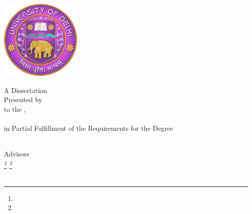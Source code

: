 \begin{titlepage}
\enlargethispage{3cm}
\centering

\includegraphics[width=4cm, height=4cm]{res/du_logo.png}

\vspace{25mm}
{\huge\textcolor{mygray}\getTitle{}}

\vspace{25mm}
A Dissertation \\
Presented by {\itshape\getAuthor{}} \\
to the {\itshape\getDepartment{}}, \\
{\itshape\getUniversity{}} \\
in Partial Fulfillment of the Requirements for the Degree \\
{\itshape\getDegree{}} \\

\vspace{25mm}

Advisors\\ 
\vspace{5mm} 
{\itshape\getAdvisorFirst{}\footnote[1]{\getAdvisorOneDesc{}} \qquad \getAdvisorSecond{}\footnote[2]{\getAdvisorTwoDesc{}}}\\
\vspace{25mm}
\textcolor{mygray}\getSubmissionDate{} \\

\end{titlepage}
